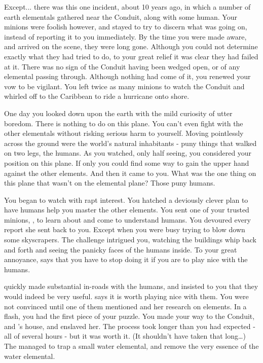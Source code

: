 \documentclass[char]{elementals}
\begin{document}
Except... there was this one incident, about 10 years ago, in which a number of earth elementals gathered near the Conduit, along with some human. Your minions were foolish however, and stayed to try to discern what was going on, instead of reporting it to you immediately. By the time you were made aware, and arrived on the scene, they were long gone. Although you could not determine exactly  what they had tried to do, to your great relief it was clear they had failed at it. There was no sign of the Conduit having been wedged open, or of any elemental passing through. Although nothing had come of it, you renewed your vow to be vigilant. You left twice as many minions to watch the Conduit and whirled off to the Caribbean to ride a hurricane onto shore.

One day you looked down upon the earth with the mild curiosity of utter boredom. There is nothing to do on this plane. You can't even fight with the other elementals without risking serious harm to yourself. Moving pointlessly across the ground were the world's natural inhabitants - puny things that walked on two legs, the humans. As you watched, only half seeing, you considered your position on this plane. If only you could find some way to gain the upper hand against the other elements. And then it came to you. What was the one thing on this plane that wasn't on the elemental plane? Those puny humans.

You began to watch with rapt interest. You hatched a deviously clever plan to have humans help you master the other elements. You sent one of your trusted minions, \cNaturalist{\intro}, to learn about and come to understand humans. You devoured every report she sent back to you. Except when you were busy trying to blow down some skyscrapers. The challenge intrigued you, watching the buildings whip back and forth and seeing the panicky faces of the humans inside. To your great annoyance, \cNaturalist{} says that you have to stop doing it if you are to play nice with the humans.

\cNaturalist{} quickly made substantial in-roads with the humans, and insisted to you that they would indeed be very useful. \cNaturalist{\They} says it is worth playing nice with them. You were not convinced until one of them mentioned \cGD{\intro} and her research on elements. In a flash, you had the first piece of your puzzle. You made your way to the Conduit, and \cGD{}'s house, and enslaved her. The process took longer than you had expected - all of several hours - but it was worth it. (It shouldn't have taken that long{\ldots}) The \cGD{\kid} managed to trap a small water elemental, and  remove the very essence of the water elemental. 
\end{document}
